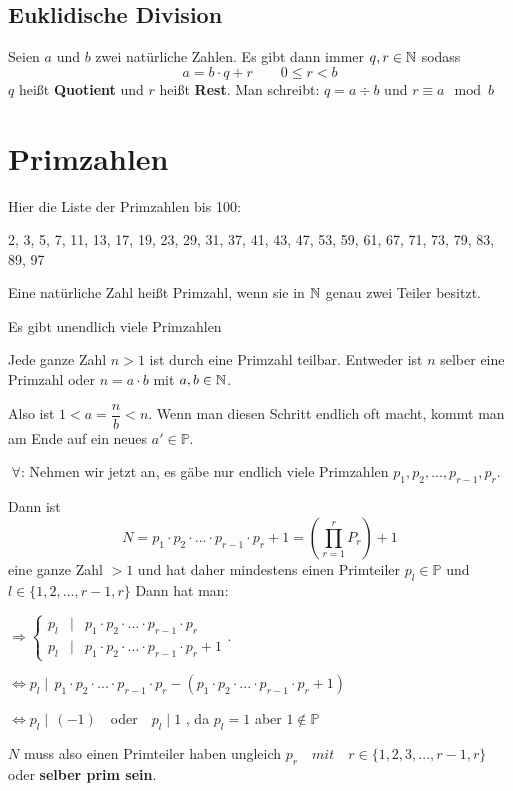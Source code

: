 \documentclass[main.tex]{subfiles}
\begin{document}
\subsection{Euklidische Division}

\begin{Definition}
	Seien $a$ und $b$ zwei natürliche Zahlen. Es gibt dann immer $q,r \in \mathbb{N}$ sodass
	$$a= b\cdot q + r \qquad 0\leq r < b$$
	$q$ heißt \textbf{Quotient} und $r$  heißt \textbf{Rest}.
	Man schreibt: \qquad $q=a \div b$ \qquad und \qquad $r \equiv a \mod b$
\end{Definition}


\section{Primzahlen}

Hier die Liste der Primzahlen bis 100:

2, 3, 5, 7, 11, 13, 17, 19, 23, 29, 31, 37, 41, 43, 47, 53, 59, 61, 67, 71, 73, 79, 83, 89, 97

\begin{Definition}
	Eine natürliche Zahl heißt Primzahl, wenn sie in $\mathbb{N}$ genau zwei Teiler besitzt.
\end{Definition}


\begin{Theorem}
	Es gibt unendlich viele Primzahlen
\end{Theorem}


\begin{Beweis}
	Jede ganze Zahl $n>1$ ist durch eine Primzahl teilbar. Entweder ist $n$ selber eine Primzahl oder $n=a\cdot b$ mit $a,b\in\mathbb{N}$.
	
	Also ist $1<a=\dfrac{n}{b}<n$. Wenn man diesen Schritt endlich oft macht, kommt man am Ende auf ein neues $a'\in\mathbb{P}$.
	
	$\;\forall$: Nehmen wir jetzt an, es gäbe nur endlich viele Primzahlen $p_{1},p_{2},...,p_{r-1},p_{r}$.
	
	Dann ist $$N=p_{1}\cdot p_{2}\cdot ... \cdot p_{r-1} \cdot p_{r} +1 = \left (\prod_{r=1}^{r}P_{r}\right ) + 1 $$ eine ganze Zahl $>1$ und hat daher mindestens einen Primteiler $p_{l} \in\mathbb{P}$ und $l\in\{1,2,...,r-1,r\}$
	Dann hat man:

	$\Rightarrow \left\{ \begin{array}{rcl}
		p_{l} & \mid & p_{1} \cdot p_{2} \cdot...\cdot p_{r-1} \cdot p_{r} \\
		p_{l} & \mid & p_{1} \cdot p_{2} \cdot...\cdot p_{r-1} \cdot p_{r} +1
	\end{array} \right.$.

	$\Leftrightarrow p_{l} \mid  \, p_{1}\cdot p_{2} \cdot...\cdot p_{r-1} \cdot p_{r} - \left (  p_{1}\cdot p_{2} \cdot...\cdot p_{r-1} \cdot p_{r} +1 \right )$
	
	$\Leftrightarrow p_{l} \mid  \, (-1) \quad $oder$ \quad p_{l} \mid  1$ \qquad  \lightning, da $p_{l}=1$ aber $1\notin \mathbb{P}$

	$N$ muss also einen Primteiler haben ungleich $p_{r} \quad mit \quad r\in\{1,2,3,...,r-1,r\}$ oder \textbf{selber prim sein}.
\end{Beweis}
\end{document}
